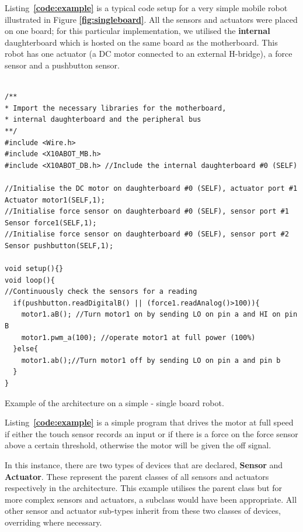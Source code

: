 Listing~\textbf{\ref{code:example}} is a typical code setup for a very simple mobile robot illustrated in Figure \textbf{\ref{fig:singleboard}}. All the sensors and actuators were placed on one board; for this particular implementation, we utilised the \textbf{internal} daughterboard which is hosted on the same board as the motherboard. This robot has one actuator (a DC motor connected to an external H-bridge), a force sensor and a pushbutton sensor.


	\begin{listing}
		\footnotesize
		\begin{verbatim}

/**
* Import the necessary libraries for the motherboard, 
* internal daughterboard and the peripheral bus
**/
#include <Wire.h>  
#include <X10ABOT_MB.h>
#include <X10ABOT_DB.h> //Include the internal daughterboard #0 (SELF)

//Initialise the DC motor on daughterboard #0 (SELF), actuator port #1
Actuator motor1(SELF,1);
//Initialise force sensor on daughterboard #0 (SELF), sensor port #1
Sensor force1(SELF,1);
//Initialise force sensor on daughterboard #0 (SELF), sensor port #2
Sensor pushbutton(SELF,1);

void setup(){}
void loop(){
//Continuously check the sensors for a reading
  if(pushbutton.readDigitalB() || (force1.readAnalog()>100)){
    motor1.aB(); //Turn motor1 on by sending LO on pin a and HI on pin B
    motor1.pwm_a(100); //operate motor1 at full power (100%) 
  }else{
    motor1.ab();//Turn motor1 off by sending LO on pin a and pin b
  }
}	 
	\end{verbatim}
		\caption{Example of the \xten architecture on a simple - single board robot.} \label{code:example}
	\end{listing}



Listing~\textbf{\ref{code:example}} is a simple program that drives the motor at full speed if either the touch sensor records an input or if there is a force on the force sensor above a certain threshold, otherwise the motor will be given the off signal.

In this instance, there are two types of devices that are declared, \textbf{Sensor} and \textbf{Actuator}. These represent the parent classes of all sensors and actuators respectively in the \xten architecture. This example utilises the parent class but for more complex sensors and actuators, a subclass would have been appropriate. All other sensor and actuator sub-types inherit from these two classes of devices, overriding where necessary.

